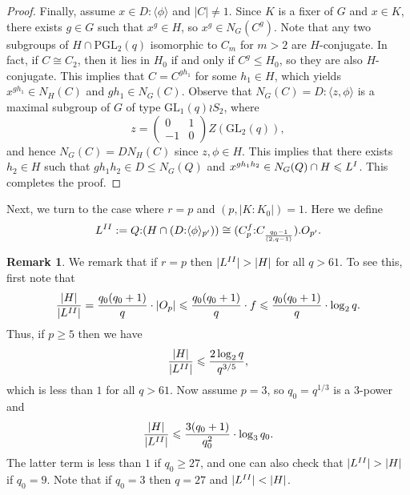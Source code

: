 \documentclass[twoside,a4paper,reqno,11pt]{amsart}
\newcommand{\<}{\langle}
\renewcommand{\>}{\rangle}
\newcommand{\la}{\langle}
\newcommand{\ra}{\rangle}
\newcommand{\leqs}{\leqslant}
\newcommand{\geqs}{\geqslant}
\newcommand{\GL}{\mathrm{GL}}
\newcommand{\PGL}{\mathrm{PGL}}
\theoremstyle{definition}
\newtheorem{rem}[thm]{Remark}
\begin{document}
\begin{proof}
		Finally, assume $x\in D{:}\la\phi\ra$ and $|C|\ne 1$. Since $K$ is a fixer of $G$ and $x\in K$, there exists $g\in G$ such that $x^g\in H$, so $x^g\in N_G(C^g)$. Note that any two subgroups of $H\cap \PGL_2(q)$ isomorphic to $C_m$ for $m > 2$ are $H$-conjugate. In fact, if $C\cong C_2$, then it lies in $H_0$ if and only if $C^g\leqs H_0$, so they are also $H$-conjugate. This implies that $C = C^{gh_1}$ for some $h_1\in H$, which yields $x^{gh_1}\in N_H(C)$ and $gh_1\in N_G(C)$. Observe that $N_G(C) = D{:}\la z,\phi\ra$ is a maximal subgroup of $G$ of type $\GL_1(q)\wr S_2$, where
		\begin{equation*}
		z =
		\begin{pmatrix}
		0&1\\
		-1&0
		\end{pmatrix}
		Z(\GL_2(q)),
		\end{equation*}
		and hence $N_G(C) = DN_H(C)$ since $z,\phi\in H$. This implies that there exists $h_2\in H$ such that $gh_1h_2\in D\leqs N_G(Q)$ and $x^{gh_1h_2}\in N_G(Q)\cap H \leqs L^{\rm I}$. This completes the proof.
	\end{proof}
	
	Next, we turn to the case where $r = p$ and $(p,|K:K_0|) = 1$. Here we define
	\begin{equation}
	\label{e:LII}
	L^{{\rm II}}:=Q{:}(H\cap (D{:}\la\phi\ra_{p'})) \cong (C_p^f{:}C_{\frac{q_0-1}{(2,q-1)}}).O_{p'}.
	\end{equation}
	
	
	\begin{rem}
		\label{r:LII_order}
		We remark that if $r = p$ then $|L^{\rm II}| > |H|$ for all $q > 61$. To see this, first note that
		\begin{equation*}
		\frac{|H|}{|L^{\rm II}|} = \frac{q_0(q_0+1)}{q}\cdot |O_p|\leqs \frac{q_0(q_0+1)}{q}\cdot f\leqs \frac{q_0(q_0+1)}{q}\cdot \log_2q.
		\end{equation*}
		Thus, if $p \geqs 5$ then we have
		\begin{equation*}
		\frac{|H|}{|L^{\rm II}|} \leqs \frac{2\log_2q}{q^{3/5}},
		\end{equation*}
		which is less than $1$ for all $q > 61$. Now assume $p = 3$, so $q_0 = q^{1/3}$ is a $3$-power and
		\begin{equation*}
		\frac{|H|}{|L^{\rm II}|} \leqs \frac{3(q_0+1)}{q_0^2}\cdot \log_3 q_0.
		\end{equation*}
		The latter term is less than $1$ if $q_0\geqs 27$, and one can also check that $|L^{\rm II}| > |H|$ if $q_0 = 9$. Note that if $q_0 = 3$ then $q = 27$ and $|L^{\rm II}| < |H|$.
	\end{rem}
	
\end{document}

